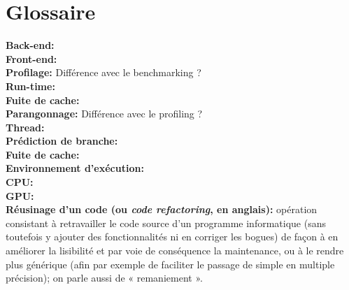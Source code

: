 \documentclass[10pt]{report}
\begin{document}
\chapter*{Glossaire}
\noindent
\textbf{Back-end:}\\ 
\textbf{Front-end:}\\
\textbf{Profilage:} Différence avec le benchmarking ?\\
\textbf{Run-time:}\\
\textbf{Fuite de cache:}\\
\textbf{Parangonnage:} Différence avec le profiling ?\\
\textbf{Thread:}\\
\textbf{Prédiction de branche:}\\
\textbf{Fuite de cache:}\\
\textbf{Environnement d'exécution:}\\
\textbf{CPU:}\\
\textbf{GPU:}\\
\textbf{Réusinage d'un code (ou \textit{code refactoring}, en anglais):} opération consistant à retravailler le code source d'un programme informatique (sans toutefois y ajouter des fonctionnalités ni en corriger les bogues) de façon à en améliorer la lisibilité et par voie de conséquence la maintenance, ou à le rendre plus générique (afin par exemple de faciliter le passage de simple en multiple précision); on parle aussi de « remaniement ». 

\end{document}
